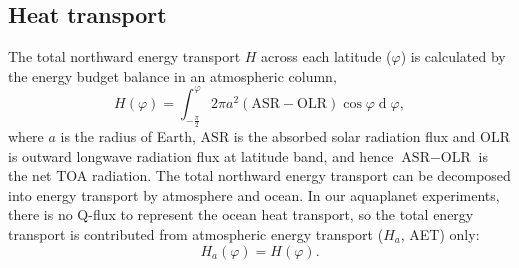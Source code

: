 \subsection{Heat transport}
\label{sec:heat_transport}

 
The total northward energy transport $H$ across each latitude ($\varphi$) is calculated by the energy budget balance in an atmospheric column,
\begin{equation}
	H(\varphi) =  \int_{-\frac{\pi}{2}}^{\varphi}2\pi a^2(\text{ASR}-\text{OLR})\operatorname{cos}\varphi \operatorname{d}\varphi,
\end{equation}  
where $a$ is the radius of Earth, $\text{ASR}$ is the absorbed solar radiation flux and $\text{OLR}$ is outward longwave radiation flux at latitude band, and hence $\text{ASR}-\text{OLR}$ is the net TOA radiation. The total northward energy transport can be decomposed into energy transport by atmosphere and ocean. In our aquaplanet experiments, there is no Q-flux to represent the ocean heat transport, so the total energy transport is contributed from atmospheric energy transport ($H_{a}$, AET) only:
\begin{equation}
	H_a(\varphi) = H(\varphi).
\end{equation}


